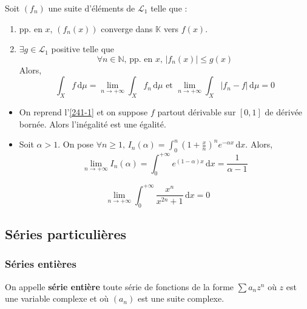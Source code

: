 	\begin{theorem}
		Soit $(f_n)$ une suite d'éléments de $\mathcal{L}_1$ telle que :
		\begin{enumerate}[label=(\roman*)]
			\item pp. en $x$, $(f_n(x))$ converge dans $\mathbb{K}$ vers $f(x)$.
			\item $\exists g \in \mathcal{L}_1$ positive telle que
			\[ \forall n \in \mathbb{N}, \, \text{pp. en } x, \, \vert f_n(x) \vert \leq g(x) \]
			Alors,
			\[ \int_X f \, \mathrm{d}\mu = \lim_{n \rightarrow +\infty} \int_X f_n \, \mathrm{d}\mu \text{ et } \lim_{n \rightarrow +\infty} \int_X \vert f_n - f \vert \, \mathrm{d}\mu = 0 \]
		\end{enumerate}
	\end{theorem}
	
	\begin{example}
		\begin{itemize}
			\item On reprend l'\cref{241-1} et on suppose $f$ partout dérivable sur $[0,1]$ de dérivée bornée. Alors l'inégalité est une égalité.
			\item Soit $\alpha > 1$. On pose $\forall n \geq 1, \, I_n(\alpha) = \int_0^n \left( 1 + \frac{x}{n} \right)^n e^{-\alpha x} \, \mathrm{d}x$. Alors,
			\[ \lim_{n \rightarrow +\infty} I_n(\alpha) = \int_0^{+\infty} e^{(1-\alpha)x} \, \mathrm{d}x = \frac{1}{\alpha - 1} \]
		\end{itemize}
	\end{example}
	
	
	\begin{example}
		\[ \lim_{n \rightarrow +\infty} \int_{0}^{+\infty} \frac{x^n}{x^{2n} + 1} \, \mathrm{d}x = 0 \]
	\end{example}
	
	\subsection{Séries particulières}
	
	\subsubsection{Séries entières}
	
	
	\begin{definition}
		On appelle \textbf{série entière} toute série de fonctions de la forme $\sum a_n z^n$ où $z$ est une variable complexe et où $(a_n)$ est une suite complexe.
	\end{definition}
	
